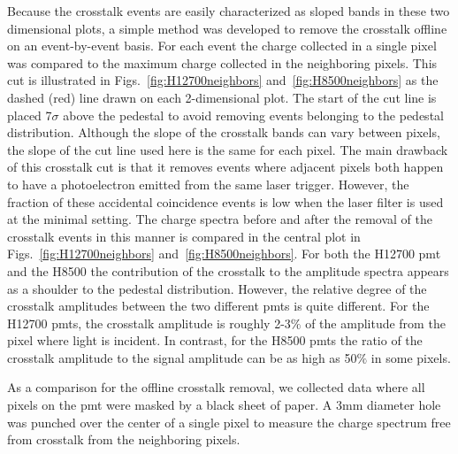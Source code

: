Because the crosstalk events are easily characterized as sloped bands in these two dimensional plots, a simple method was developed to remove the crosstalk offline on an event-by-event basis. For each event the charge collected in a single pixel was compared to the maximum charge collected in the neighboring pixels. This cut is illustrated in Figs.~\ref{fig:H12700neighbors} and~\ref{fig:H8500neighbors} as the dashed (red) line drawn on each 2-dimensional plot. The start of the cut line is placed 7$\sigma$ above the pedestal to avoid removing events belonging to the pedestal distribution. Although the slope of the crosstalk bands can vary between pixels, the slope of the cut line used here is the same for each pixel. The main drawback of this crosstalk cut is that it removes events where adjacent pixels both happen to have a photoelectron emitted from the same laser trigger. However, the fraction of these accidental coincidence events is low when the laser filter is used at the minimal setting. The charge spectra before and after the removal of the crosstalk events in this manner is compared in the central plot in Figs.~\ref{fig:H12700neighbors} and~\ref{fig:H8500neighbors}. For both the H12700 pmt and the H8500 the contribution of the crosstalk to the amplitude spectra appears as a shoulder to the pedestal distribution. However, the relative degree of the crosstalk amplitudes between the two different pmts is quite different. For the H12700 pmts, the crosstalk amplitude is roughly 2-3$\%$ of the amplitude from the pixel where light is incident. In contrast, for the H8500 pmts the ratio of the crosstalk amplitude to the signal amplitude can be as high as 50$\%$ in some pixels. 

As a comparison for the offline crosstalk removal, we collected data where all pixels on the pmt were masked by a black sheet of paper. A 3mm diameter hole was punched over the center of a single pixel to measure the charge spectrum free from crosstalk from the neighboring pixels. 